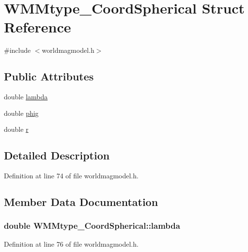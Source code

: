 \hypertarget{struct_w_m_mtype___coord_spherical}{\section{\-W\-M\-Mtype\-\_\-\-Coord\-Spherical \-Struct \-Reference}
\label{struct_w_m_mtype___coord_spherical}
}


{\ttfamily \#include $<$worldmagmodel.\-h$>$}

\subsection*{\-Public \-Attributes}
\begin{DoxyCompactItemize}
\item 
double \hyperlink{struct_w_m_mtype___coord_spherical_a325e642d20cf8e2cf39cff24d86047aa}{lambda}
\item 
double \hyperlink{struct_w_m_mtype___coord_spherical_a3c1dc1afddaf89194d67521dfe135585}{phig}
\item 
double \hyperlink{struct_w_m_mtype___coord_spherical_a24681de24337609c5f3dc7a6346c6674}{r}
\end{DoxyCompactItemize}


\subsection{\-Detailed \-Description}


\-Definition at line 74 of file worldmagmodel.\-h.



\subsection{\-Member \-Data \-Documentation}
\hypertarget{struct_w_m_mtype___coord_spherical_a325e642d20cf8e2cf39cff24d86047aa}{
\subsubsection[{lambda}]{\setlength{\rightskip}{0pt plus 5cm}double {\bf \-W\-M\-Mtype\-\_\-\-Coord\-Spherical\-::lambda}}}\label{struct_w_m_mtype___coord_spherical_a325e642d20cf8e2cf39cff24d86047aa}


\-Definition at line 76 of file worldmagmodel.\-h.

